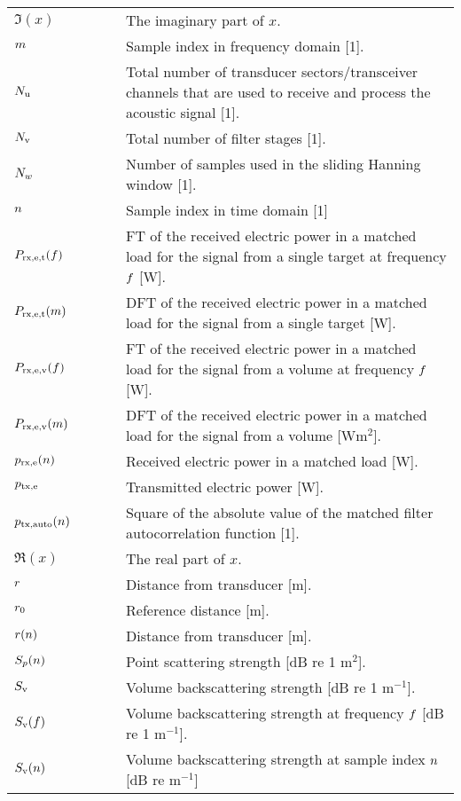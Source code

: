 \documentclass[preprint,12pt,TurnOnLineNumbers]{JASAnew}
\begin{document}
\begin{longtable}{p{0.25\linewidth} p{0.75\linewidth}}
$\Im(x)$ & The imaginary part of $x$.\\

$m$ & Sample index in frequency domain [1].\\

$N_{\textrm{u}}$ & Total number of transducer sectors/transceiver channels that are used to receive and process the acoustic signal [1].\\
$N_{\textrm{v}}$ & Total number of filter stages [1].\\
$N_{w}$ & Number of samples used in the sliding Hanning window [1].\\
$n$ & Sample index in time domain [1]\\

$P_{\textrm{rx,e,t}}(f)$ & FT of the received electric power in a matched load for the signal from a single target at frequency $f$ [W].\\
$P_{\textrm{rx,e,t}}(m)$ & DFT of the received electric power in a matched load for the signal from a single target [W].\\
$P_{\textrm{rx,e,v}}(f)$ & FT of the received electric power in a matched load for the signal from a volume at frequency $f$ [W].\\
$P_{\textrm{rx,e,v}}(m)$ & DFT of the received electric power in a matched load for the signal from a volume [W$\textrm{m}^2$].\\
$p_{\textrm{rx,e}}(n)$  & Received electric power in a matched load [W].\\

$p_{\textrm{tx,e}}$ & Transmitted electric power [W].\\
$p_{\textrm{tx,auto}}(n)$ & Square of the absolute value of the matched filter autocorrelation function [1].\\

$\Re(x)$ & The real part of $x$.\\
$r$ & Distance from transducer [m].\\
$r_0$ & Reference distance [m]. \\
$r(n)$ & Distance from transducer [m].\\

$S_p(n)$  & Point scattering strength [dB re 1 $\textrm{m}^2$].\\
$S_{\textrm{v}}$  & Volume backscattering strength [dB re 1 $\textrm{m}^{-1}$].\\
$S_{\textrm{v}}(f)$ & Volume backscattering strength at frequency $f$ [dB re 1 $\textrm{m}^{-1}$].\\
$S_{\textrm{v}}(n)$ & Volume backscattering strength at sample index $n$ [dB re $\textrm{m}^{-1}$]\\


\end{longtable}
\end{document}
